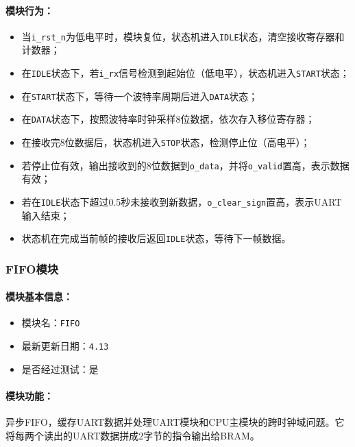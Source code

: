 \documentclass[lang=cn,a4paper,newtx]{elegantpaper}
\begin{document}
\paragraph{模块行为：}
\begin{itemize}
  \item 当\texttt{i\_rst\_n}为低电平时，模块复位，状态机进入\texttt{IDLE}状态，清空接收寄存器和计数器；
  \item 在\texttt{IDLE}状态下，若\texttt{i\_rx}信号检测到起始位（低电平），状态机进入\texttt{START}状态；
  \item 在\texttt{START}状态下，等待一个波特率周期后进入\texttt{DATA}状态；
  \item 在\texttt{DATA}状态下，按照波特率时钟采样8位数据，依次存入移位寄存器；
  \item 在接收完8位数据后，状态机进入\texttt{STOP}状态，检测停止位（高电平）；
  \item 若停止位有效，输出接收到的8位数据到\texttt{o\_data}，并将\texttt{o\_valid}置高，表示数据有效；
  \item 若在\texttt{IDLE}状态下超过0.5秒未接收到新数据，\texttt{o\_clear\_sign}置高，表示UART输入结束；
  \item 状态机在完成当前帧的接收后返回\texttt{IDLE}状态，等待下一帧数据。
\end{itemize}
\subsubsection{FIFO模块}
\paragraph{模块基本信息：}
\begin{itemize}
  \item 模块名：\texttt{FIFO}
  \item 最新更新日期：\texttt{4.13}
  \item 是否经过测试：是
\end{itemize}
\paragraph{模块功能：}
异步FIFO，缓存UART数据并处理UART模块和CPU主模块的跨时钟域问题。它将每两个读出的UART数据拼成2字节的指令输出给BRAM。
\end{document}
